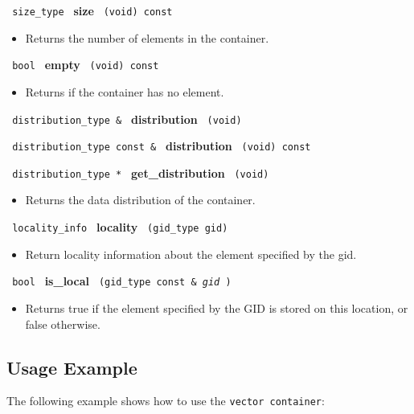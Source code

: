 \noindent
\texttt{%
size\_type
}
\textbf{size}%
\texttt{%
(void) const
}

\begin{itemize}
\item
Returns the number of elements in the container. 
\end{itemize}
 
\noindent
\texttt{%
bool
}
\textbf{empty}%
\texttt{%
(void) const
}

\begin{itemize}
\item
Returns if the container has no element.
\end{itemize}
 
\noindent
\texttt{%
distribution\_type \& 
}
\textbf{distribution}%
\texttt{%
 (void)
}
 
\noindent
\texttt{%
distribution\_type const \& 
}
\textbf{distribution}%
\texttt{%
 (void) const
}
 
\noindent
\texttt{%
distribution\_type *
}
\textbf{get\_distribution}%
\texttt{%
(void)
}
 
\begin{itemize}
\item
Returns the data distribution of the container.
\end{itemize}

\noindent
\texttt{%
locality\_info 
}
\textbf{locality}%
\texttt{%
 (gid\_type gid)
}

\begin{itemize}
\item
Return locality information about the element specified by the gid. 
\end{itemize}
 
\noindent
\texttt{%
bool
}
\textbf{is\_local}%
\texttt{%
(gid\_type const \&
\textit{gid}%
)
}

\begin{itemize}
\item
Returns true if the element specified by the GID is stored on this location, or false otherwise. 
\end{itemize}


\subsection{Usage Example} \label{sec-vec-cont-use}

The following example shows how to use the \texttt{vector container}:


